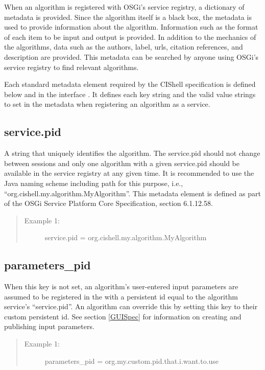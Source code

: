 When an algorithm is registered with OSGi's service registry, a dictionary of
metadata is provided. Since the algorithm itself is a black box, the metadata is
used to provide information about the algorithm. Information such as the format
of each  item to be input and output is provided. In addition to the
mechanics of the algorithms, data such as the authors, label, urls, citation
references, and description are provided. This metadata can be searched by anyone
using OSGi's service registry to find relevant algorithms.

Each standard metadata element required by the CIShell specification is defined
below and in the interface . It defines each key string
and the valid value strings to set in the metadata  when
registering an algorithm as a service.

\subsection*{service.pid}
A string that uniquely identifies the algorithm. The service.pid should not
change between sessions and only one algorithm with a given service.pid should
be available in the service registry at any given time. It is recommended to 
use the Java naming scheme including path for this purpose, i.e.,
``org.cishell.my.algorithm.MyAlgorithm''. This metadata element is defined
as part of the OSGi Service Platform Core Specification, section 6.1.12.58. 

\begin{quote}
\begin{description}
  \item[Example 1:] service.pid = org.cishell.my.algorithm.MyAlgorithm
\end{description}
\end{quote}


\subsection*{parameters\_pid} 

When this key is not set, an algorithm's user-entered input parameters are
assumed to be registered in the  with a persistent id
equal to the algorithm service's ``service.pid''. An algorithm can override this
by setting this key to their custom persistent id. See section \ref{GUISpec}
for information on creating and publishing input parameters.

\begin{quote}
\begin{description}
  \item[Example 1:] parameters\_pid = org.my.custom.pid.that.i.want.to.use
\end{description}
\end{quote}


